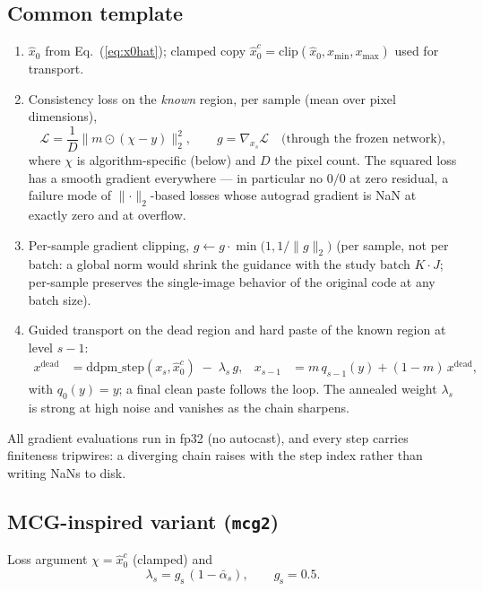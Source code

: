 \documentclass[11pt]{article}
\begin{document}
\subsection{Common template}
\begin{enumerate}
  \item $\hat x_0$ from Eq.~(\ref{eq:x0hat}); clamped copy
        $\hat x_0^{c} = \mathrm{clip}(\hat x_0, x_{\min}, x_{\max})$
        used for transport.
  \item Consistency loss on the \emph{known} region, per sample
        (mean over pixel dimensions),
        \begin{equation}
          \mathcal{L} = \frac{1}{D}\bigl\lVert m \odot (\chi - y)
                        \bigr\rVert_2^2 ,
          \qquad
          g = \nabla_{x_s} \mathcal{L}
          \quad\text{(through the frozen network)},
          \label{eq:loss}
        \end{equation}
        where $\chi$ is algorithm-specific (below) and $D$ the pixel
        count.  The squared loss has a smooth gradient everywhere ---
        in particular no $0/0$ at zero residual, a failure mode of
        $\lVert\cdot\rVert_2$-based losses whose autograd gradient is
        NaN at exactly zero and at overflow.
  \item Per-sample gradient clipping,
        $g \leftarrow g \cdot \min\!\bigl(1, 1/\lVert g\rVert_2\bigr)$
        (per sample, not per batch: a global norm would shrink the
        guidance with the study batch $K\!\cdot\!J$; per-sample
        preserves the single-image behavior of the original code at any
        batch size).
  \item Guided transport on the dead region and hard paste of the known
        region at level $s{-}1$:
        \begin{align}
          x^{\mathrm{dead}} &= \mathrm{ddpm\_step}(x_s, \hat x_0^{c})
                               \;-\; \lambda_s\, g, &
          x_{s-1} &= m\, q_{s-1}(y) + (1{-}m)\, x^{\mathrm{dead}},
        \end{align}
        with $q_{0}(y) = y$; a final clean paste follows the loop.
        The annealed weight $\lambda_s$ is strong at high noise and
        vanishes as the chain sharpens.
\end{enumerate}
All gradient evaluations run in fp32 (no autocast), and every step
carries finiteness tripwires: a diverging chain raises with the step
index rather than writing NaNs to disk.

\subsection{MCG-inspired variant (\texttt{mcg2})}
Loss argument $\chi = \hat x_0^{c}$ (clamped) and
\begin{equation}
  \lambda_s = g_{\mathrm{s}} \,(1 - \bar\alpha_s),
  \qquad g_{\mathrm{s}} = 0.5 .
\end{equation}
\end{document}
